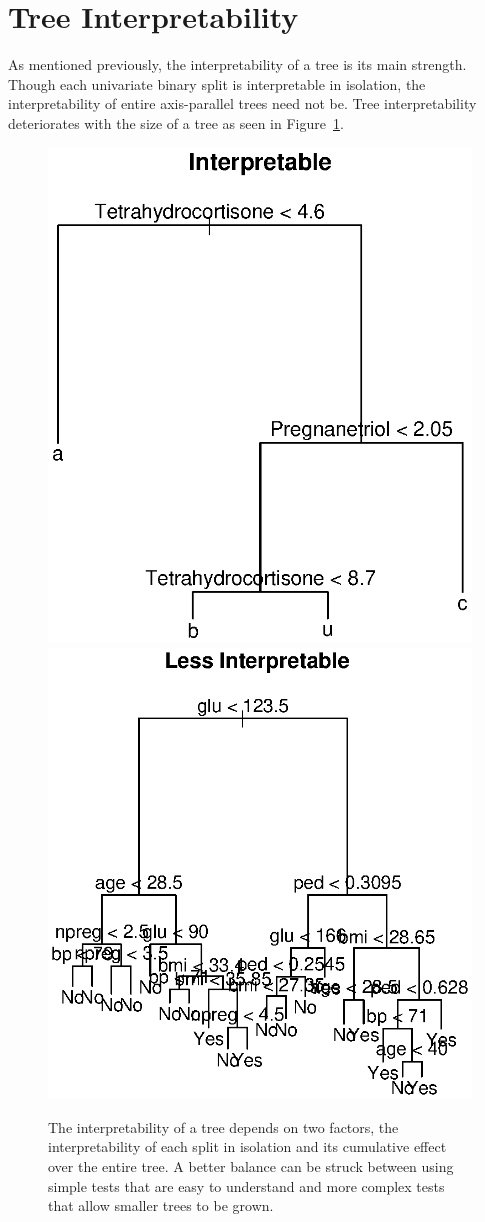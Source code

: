 \section{Tree Interpretability}
\label{TreeInterpretability}
As mentioned previously, the interpretability of a tree is its main strength. Though each univariate binary split is interpretable in isolation, the interpretability of entire axis-parallel trees need not be. Tree interpretability deteriorates with the size of a tree as seen in Figure~\ref{fig_tree_interpretability}.\\
\begin{figure}
\centering
\includegraphics[width=.49\textwidth]{fig_tree_interpretability_more.ps}
\includegraphics[width=.49\textwidth]{fig_tree_interpretability_less.ps}
\caption{The interpretability of a tree depends on two factors, the interpretability of each split in isolation and its cumulative effect over the entire tree. A better balance can be struck between using simple tests that are easy to understand and more complex tests that allow smaller trees to be grown.}
\label{fig_tree_interpretability}
\end{figure}


